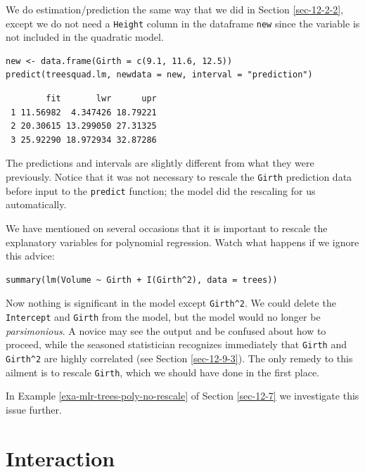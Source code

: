 \documentclass[captions=tableheading]{scrbook}
\begin{document}
We do estimation/prediction the same way that we did in Section \ref{sec-12-2-2}, except we do not need a \texttt{Height} column in the dataframe \texttt{new} since the variable is not included in the quadratic model.


\lstset{language=R}
\begin{lstlisting}
new <- data.frame(Girth = c(9.1, 11.6, 12.5))
predict(treesquad.lm, newdata = new, interval = "prediction")
\end{lstlisting}

\begin{verbatim}
        fit       lwr      upr
 1 11.56982  4.347426 18.79221
 2 20.30615 13.299050 27.31325
 3 25.92290 18.972934 32.87286
\end{verbatim}

The predictions and intervals are slightly different from what they were previously. Notice that it was not necessary to rescale the \texttt{Girth} prediction data before input to the \texttt{predict} function; the model did the rescaling for us automatically.

\begin{rem}
We have mentioned on several occasions that it is important to rescale the explanatory variables for polynomial regression. Watch what happens if we ignore this advice:


\lstset{language=R}
\begin{lstlisting}
summary(lm(Volume ~ Girth + I(Girth^2), data = trees))
\end{lstlisting}

Now nothing is significant in the model except \texttt{Girth\textasciicircum{}2}. We could delete the \texttt{Intercept} and \texttt{Girth} from the model, but the model would no longer be \emph{parsimonious}. A novice may see the output and be confused about how to proceed, while the seasoned statistician recognizes immediately that \texttt{Girth} and \texttt{Girth\textasciicircum{}2} are highly correlated (see Section \ref{sec-12-9-3}). The only remedy to this ailment is to rescale \texttt{Girth}, which we should have done in the first place.

In Example \ref{exa-mlr-trees-poly-no-rescale} of Section \ref{sec-12-7} we investigate this issue further.

\end{rem}
\section{Interaction}
\label{sec-12-5}
\label{sec-Interaction}
\end{document}
